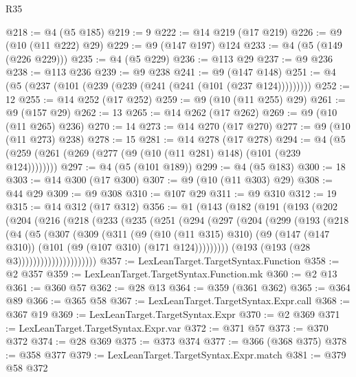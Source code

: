\begin{lexlean}{R35}
\begin{coremodule}
@218 := @4 (@5 @185)
@219 := 9
@222 := @14 @219 (@17 @219)
@226 := @9 (@10 (@11 @222) @29)
@229 := @9 (@147 @197) @124
@233 := @4 (@5 (@149 (@226 @229)))
@235 := @4 (@5 @229)
@236 := @113 @29
@237 := @9 @236
@238 := @113 @236
@239 := @9 @238
@241 := @9 (@147 @148)
@251 := @4 (@5 (@237 (@101 (@239 (@239 (@241 (@241 (@101 (@237 @124)))))))))
@252 := 12
@255 := @14 @252 (@17 @252)
@259 := @9 (@10 (@11 @255) @29)
@261 := @9 (@157 @29)
@262 := 13
@265 := @14 @262 (@17 @262)
@269 := @9 (@10 (@11 @265) @236)
@270 := 14
@273 := @14 @270 (@17 @270)
@277 := @9 (@10 (@11 @273) @238)
@278 := 15
@281 := @14 @278 (@17 @278)
@294 := @4 (@5 (@259 (@261 (@269 (@277 (@9 (@10 (@11 @281) @148) (@101 (@239 @124))))))))
@297 := @4 (@5 (@101 @189))
@299 := @4 (@5 @183)
@300 := 18
@303 := @14 @300 (@17 @300)
@307 := @9 (@10 (@11 @303) @29)
@308 := @44 @29
@309 := @9 @308
@310 := @107 @29
@311 := @9 @310
@312 := 19
@315 := @14 @312 (@17 @312)
@356 := @1
    (@143
      (@182
        (@191
          (@193
            (@202
              (@204
                (@216
                  (@218
                    (@233
                      (@235
                        (@251
                          (@294
                            (@297
                              (@204
                                (@299
                                  (@193
                                    (@218
                                      (@4
                                        (@5
                                          (@307
                                            (@309
                                              (@311
                                                (@9
                                                  (@10 (@11 @315) @310)
                                                  (@9
                                                    (@147 (@147 @310))
                                                    (@101 (@9 (@107 @310) (@171 @124)))))))))
                                        (@193 (@193 (@28 @3)))))))))))))))))))))
@357 := LexLeanTarget.TargetSyntax.Function
@358 := @2 @357
@359 := LexLeanTarget.TargetSyntax.Function.mk
@360 := @2 @13
@361 := @360 @57
@362 := @28 @13
@364 := @359 (@361 @362)
@365 := @364 @89
@366 := @365 @58
@367 := LexLeanTarget.TargetSyntax.Expr.call
@368 := @367 @19
@369 := LexLeanTarget.TargetSyntax.Expr
@370 := @2 @369
@371 := LexLeanTarget.TargetSyntax.Expr.var
@372 := @371 @57
@373 := @370 @372
@374 := @28 @369
@375 := @373 @374
@377 := @366 (@368 @375)
@378 := @358 @377
@379 := LexLeanTarget.TargetSyntax.Expr.match
@381 := @379 @58 @372

\end{coremodule}
\end{lexlean}
